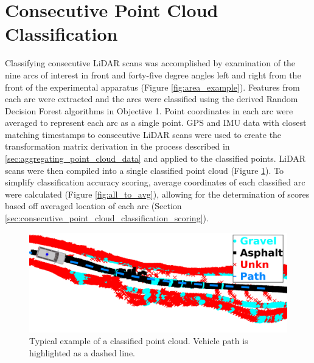\documentclass[numbered,pdftex]{ohio-etd}
\begin{document}
{{	} %
	


	\section{Consecutive Point Cloud Classification}\label{sec:consecutive_point_cloud_classification}{
	
		{Classifying consecutive LiDAR scans was accomplished by examination of the nine arcs of interest in front and forty-five degree angles left and right from the front of the experimental apparatus (Figure \ref{fig:area_example}). Features from each arc were extracted and the arcs were classified using the derived Random Decision Forest algorithms in Objective 1. Point coordinates in each arc were averaged to represent each arc as a single point. GPS and IMU data with closest matching timestamps to consecutive LiDAR scans were used to create the transformation matrix derivation in the process described in \ref{sec:aggregating_point_cloud_data} and applied to the classified points. LiDAR scans were then compiled into a single classified point cloud (Figure \ref{fig:db_1_all_points_example_withvan}). To simplify classification accuracy scoring, average coordinates of each classified arc were calculated (Figure \ref{fig:all_to_avg}), allowing for the determination of scores based off averaged location of each arc (Section \ref{sec:consecutive_point_cloud_classification_scoring}).}
		
		\begin{figure}[H]
			\centering
			\includegraphics[width=0.9\linewidth]{Defense_Images/db_1_all_points_example_withvan}
			\caption[Classified Point Cloud]{Typical example of a classified point cloud. Vehicle path is highlighted as a dashed line.}
			\label{fig:db_1_all_points_example_withvan}
		\end{figure}
		
}}
\end{document}
